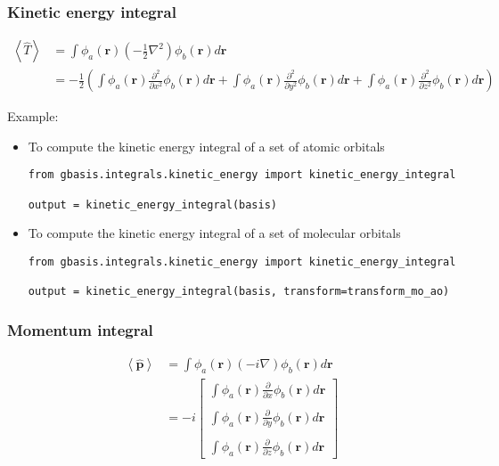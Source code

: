 \documentclass[letterpaper]{article}
\begin{document}
\subsubsection{Kinetic energy integral}
\begin{equation}
  \label{eq:kinetic_energy}
  \begin{split}
    \left< \hat{T} \right>
    &= \int \phi_a(\mathbf{r}) \left( -\frac{1}{2} \nabla^2 \right) \phi_b(\mathbf{r}) d\mathbf{r}\\
    &= -\frac{1}{2}
    \left(
      \int \phi_a(\mathbf{r}) \frac{\partial^2}{\partial x^2} \phi_b(\mathbf{r}) d\mathbf{r}
      + \int \phi_a(\mathbf{r}) \frac{\partial^2}{\partial y^2} \phi_b(\mathbf{r}) d\mathbf{r}
      + \int \phi_a(\mathbf{r}) \frac{\partial^2}{\partial z^2} \phi_b(\mathbf{r}) d\mathbf{r}
    \right)
  \end{split}
\end{equation}

Example:
\begin{itemize}
\item To compute the kinetic energy integral of a set of atomic orbitals
  \begin{lstlisting}[xleftmargin=-25pt]
from gbasis.integrals.kinetic_energy import kinetic_energy_integral

output = kinetic_energy_integral(basis)
\end{lstlisting}
\item To compute the kinetic energy integral of a set of molecular orbitals
  \begin{lstlisting}[xleftmargin=-25pt]
from gbasis.integrals.kinetic_energy import kinetic_energy_integral

output = kinetic_energy_integral(basis, transform=transform_mo_ao)
\end{lstlisting}
\end{itemize}
\subsubsection{Momentum integral}
\begin{equation}
  \label{eq:momentum}
  \begin{split}
    \left< \hat{\mathbf{p}} \right>
    &= \int \phi_a(\mathbf{r}) \left( -i \nabla \right) \phi_b(\mathbf{r}) d\mathbf{r}\\
    &= -i
    \begin{bmatrix}
      \int \phi_a(\mathbf{r}) \frac{\partial}{\partial x} \phi_b(\mathbf{r}) d\mathbf{r}\\\\
      \int \phi_a(\mathbf{r}) \frac{\partial}{\partial y} \phi_b(\mathbf{r}) d\mathbf{r}\\\\
      \int \phi_a(\mathbf{r}) \frac{\partial}{\partial z} \phi_b(\mathbf{r}) d\mathbf{r}
    \end{bmatrix}
  \end{split}
\end{equation}
\end{document}
